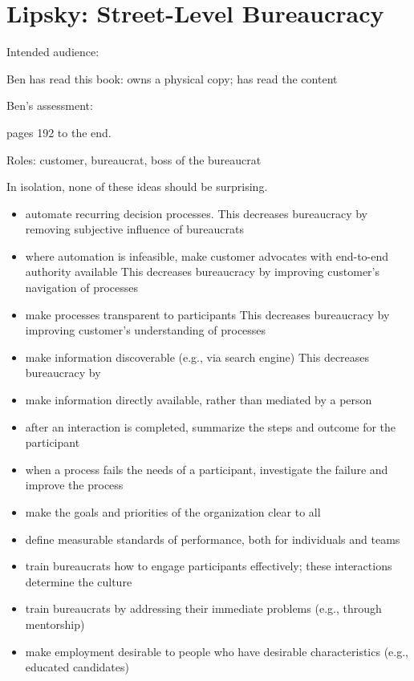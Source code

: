 \section{Lipsky: Street-Level Bureaucracy\label{review:lipsky_street}}

\cite{1983_Lipsky}

Intended audience:

Ben has read this book: owns a physical copy; has read the content

Ben's assessment: 


pages 192 to the end.

Roles: customer, bureaucrat, boss of the bureaucrat

In isolation, none of these ideas should be surprising.
\begin{itemize}
    \item automate recurring decision processes. This decreases bureaucracy by removing subjective influence of bureaucrats
\item where automation is infeasible, make customer advocates with end-to-end authority available
This decreases bureaucracy by improving customer's navigation of processes
\item make processes transparent to participants
This decreases bureaucracy by improving customer's understanding of processes
\item make information discoverable (e.g., via search engine) 
This decreases bureaucracy by 
\item make information directly available, rather than mediated by a person
\item after an interaction is completed, summarize the steps and outcome for the participant
\item when a process fails the needs of a participant, investigate the failure and improve the process
\item make the goals and priorities of the organization clear to all
\item define measurable standards of performance, both for individuals and teams
\item train bureaucrats how to engage participants effectively; these interactions determine the culture
\item train bureaucrats by addressing their immediate problems (e.g., through mentorship)
\item make employment desirable to people who have desirable characteristics (e.g., educated candidates)

\end{itemize}
